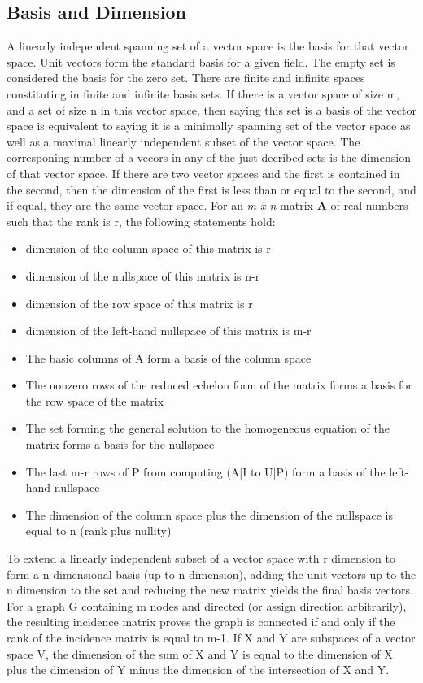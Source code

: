 \documentclass[12pt]{article}
\begin{document}
\subsection{Basis and Dimension}
A linearly independent spanning set of a vector space is the basis for that vector space. Unit vectors form the standard basis for a given field. The empty set is considered the basis 
for the zero set. There are finite and infinite spaces constituting in finite and infinite basis sets. If there is a vector space of size m, and a set of size n in this vector space, 
then saying this set is a basis of the vector space is equivalent to saying it is a minimally spanning set of the vector space as well as a maximal linearly independent subset of the 
vector space. The corresponing number of a vecors in any of the just decribed sets is the dimension of that vector space. If there are two vector spaces and the first is contained in the 
second, then the dimension of the first is less than or equal to the second, and if equal, they are the same vector space. 
\newline
\newline
For an \textit{m x n} matrix \textbf{A} of real numbers such that the rank is r, the following statements hold:
\begin{itemize}
    \item dimension of the column space of this matrix is r
    \item dimension of the nullspace of this matrix is n-r
    \item dimension of the row space of this matrix is r
    \item dimension of the left-hand nullspace of this matrix is m-r
    \item The basic columns of A form a basis of the column space
    \item The nonzero rows of the reduced echelon form of the matrix forms a basis for the row space of the matrix
    \item The set forming the general solution to the homogeneous equation of the matrix forms a basis for the nullspace
    \item The last m-r rows of P from computing (A|I to U|P) form a basis of the left-hand nullspace
    \item The dimension of the column space plus the dimension of the nullspace is equal to n (rank plus nullity)
\end{itemize}
To extend a linearly independent subset of a vector space with r dimension to form a n dimensional basis (up to n dimension), adding the unit vectors up to the n dimension to the set and 
reducing the new matrix yields the final basis vectors. 
\newline
\newline
For a graph G containing m nodes and directed (or assign direction arbitrarily), the resulting incidence matrix proves the graph is connected if and only if the rank of the incidence matrix 
is equal to m-1. If X and Y are subspaces of a vector space V, the dimension of the sum of X and Y is equal to the dimension of X plus the dimension of Y minus the dimension of the 
intersection of X and Y. 
\end{document}
